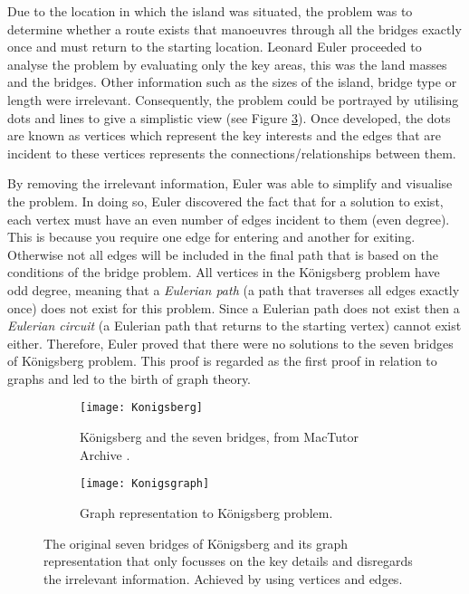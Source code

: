 Due to the location in which the island was situated, the problem was to determine whether a route exists that manoeuvres through all the bridges exactly once and must return to the starting location. Leonard Euler proceeded to analyse the problem by evaluating only the key areas, this was the land masses and the bridges. Other information such as the sizes of the island, bridge type or length were irrelevant. Consequently, the problem could be portrayed by utilising dots and lines to give a simplistic view (see Figure \ref{fig:Königsberg's Graph}). Once developed, the dots are known as vertices which represent the key interests and the edges that are incident to these vertices represents the connections/relationships between them.

By removing the irrelevant information, Euler was able to simplify and visualise the problem. In doing so, Euler discovered the fact that for a solution to exist, each vertex must have an even number of edges incident to them (even degree). This is because you require one edge for entering and another for exiting. Otherwise not all edges will be included in the final path that is based on the conditions of the bridge problem. All vertices in the Königsberg problem have odd degree, meaning that a \emph{Eulerian path} (a path that traverses all edges exactly once) does not exist for this problem. Since a Eulerian path does not exist then a \emph{Eulerian circuit} (a Eulerian path that returns to the starting vertex) cannot exist either. Therefore, Euler proved that there were no solutions to the seven bridges of Königsberg problem. This proof is regarded as the first proof in relation to graphs and led to the birth of graph theory.

\begin{figure}[!htb]
\centering
\begin{subfigure}{.45\textwidth}
	\texttt{[image: Konigsberg]}
	\caption{Königsberg and the seven bridges, from MacTutor Archive \cite{MacTutor}.}
	\label{fig:Königsberg's Bridges}
\end{subfigure}
\hfill
\begin{subfigure}{.45\textwidth}
	\texttt{[image: Konigsgraph]}
	\caption{Graph representation to Königsberg problem.}
	\label{fig:Königsberg's Graph}
\end{subfigure}
\caption{The original seven bridges of Königsberg and its graph representation that only focusses on the key details and disregards the irrelevant information. Achieved by using vertices and edges.}
\end{figure}

